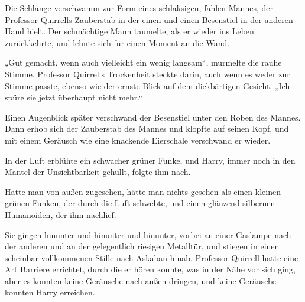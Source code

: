 Die Schlange verschwamm zur Form eines schlaksigen, fahlen Mannes, der Professor Quirrells Zauberstab in der einen und einen Besenstiel in der anderen Hand hielt. Der schmächtige Mann taumelte, als er wieder ins Leben zurückkehrte, und lehnte sich für einen Moment an die Wand.

„Gut gemacht, wenn auch vielleicht ein wenig langsam“, murmelte die rauhe Stimme. Professor Quirrells Trockenheit steckte darin, auch wenn es weder zur Stimme passte, ebenso wie der ernste Blick auf dem dickbärtigen Gesicht. „Ich spüre sie jetzt überhaupt nicht mehr.“

Einen Augenblick später verschwand der Besenstiel unter den Roben des Mannes. Dann erhob sich der Zauberstab des Mannes und klopfte auf seinen Kopf, und mit einem Geräusch wie eine knackende Eierschale verschwand er wieder.

In der Luft erblühte ein schwacher grüner Funke, und Harry, immer noch in den Mantel der Unsichtbarkeit gehüllt, folgte ihm nach.

Hätte man von außen zugesehen, hätte man nichts gesehen als einen kleinen grünen Funken, der durch die Luft schwebte, und einen glänzend silbernen Humanoiden, der ihm nachlief.

\later

Sie gingen hinunter und hinunter und hinunter, vorbei an einer Gaslampe nach der anderen und an der gelegentlich riesigen Metalltür, und stiegen in einer scheinbar vollkommenen Stille nach Askaban hinab. Professor Quirrell hatte eine Art Barriere errichtet, durch die er hören konnte, was in der Nähe vor sich ging, aber es konnten keine Geräusche nach außen dringen, und keine Geräusche konnten Harry erreichen.

